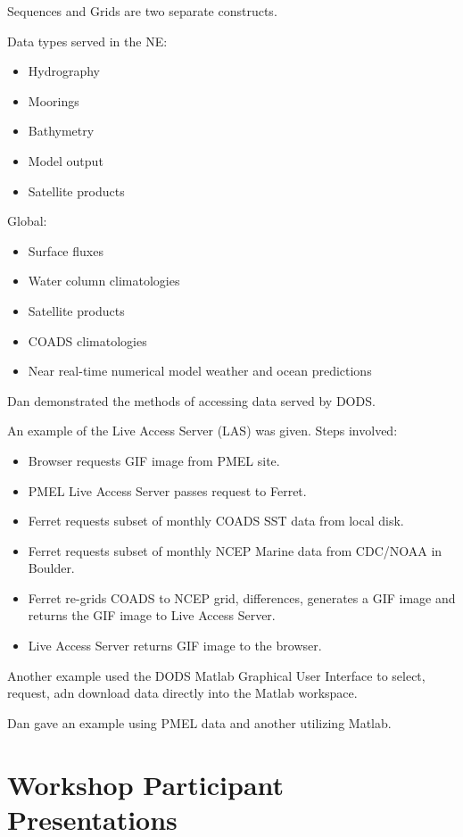 Sequences and Grids are two separate constructs.

Data types served in the NE: 
\begin{itemize}
\item Hydrography
\item Moorings
\item Bathymetry
\item Model output
\item Satellite products
\end{itemize}

Global:
\begin{itemize}
\item Surface fluxes
\item Water column climatologies
\item Satellite products
\item COADS climatologies
\item Near real-time numerical model weather and ocean predictions
\end{itemize}

Dan demonstrated the methods of accessing data served by DODS.

An example of the Live Access Server (LAS) was given.
Steps involved:
\begin{itemize}
\item Browser requests GIF image from PMEL site.
\item PMEL Live Access Server passes request to Ferret.
\item Ferret requests subset of monthly COADS SST data from local disk.
\item Ferret requests subset of monthly NCEP Marine data from CDC/NOAA in Boulder.
\item Ferret re-grids COADS to NCEP grid, differences, generates a GIF
  image and returns the GIF image to Live Access Server.
\item Live Access Server returns GIF image to the browser.
\end{itemize}

Another example used the DODS Matlab Graphical User Interface to
select, request, adn download data directly into the Matlab workspace.

Dan gave an example using PMEL data and another utilizing Matlab.

\section{Workshop Participant Presentations}

